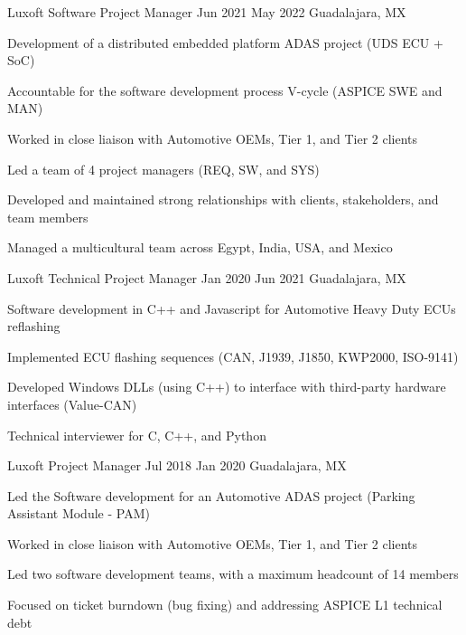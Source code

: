 \documentclass{resume} %
\begin{document}
\job
    {Luxoft}
    {Software Project Manager}
    {Jun 2021}
    {May 2022}
    {Guadalajara, MX}
    {
    \begin{itemize-bullets}
    \item{Development of a distributed embedded platform ADAS project (UDS ECU + SoC)}
    \item{Accountable for the software development process V-cycle (ASPICE SWE and MAN)}
    \item{Worked in close liaison with Automotive OEMs, Tier 1, and Tier 2 clients}
    \item{Led a team of 4 project managers (REQ, SW, and SYS)}
    \item{Developed and maintained strong relationships with clients, stakeholders, and team members}
    \item{Managed a multicultural team across Egypt, India, USA, and Mexico}
    \end{itemize-bullets}
    }


\job
    {Luxoft}
    {Technical Project Manager}
    {Jan 2020}
    {Jun 2021}
    {Guadalajara, MX}
    {
    \begin{itemize-bullets}
    \item{Software development in C++ and Javascript for Automotive Heavy Duty ECUs reflashing}
    \item{Implemented ECU flashing sequences (CAN, J1939, J1850, KWP2000, ISO-9141)}
    \item{Developed Windows DLLs (using C++) to interface with third-party hardware interfaces (Value-CAN)}
    \item{Technical interviewer for C, C++, and Python}
    \end{itemize-bullets}
    }


\job
    {Luxoft}
    {Project Manager}
    {Jul 2018}
    {Jan 2020}
    {Guadalajara, MX}
    {
    \begin{itemize-bullets}
    \item{Led the Software development for an Automotive ADAS project (Parking Assistant Module - PAM)}
    \item{Worked in close liaison with Automotive OEMs, Tier 1, and Tier 2 clients}
    \item{Led two software development teams, with a maximum headcount of 14 members}
    \item{Focused on ticket burndown (bug fixing) and addressing ASPICE L1 technical debt}
    \end{itemize-bullets}
    }
\end{document}
